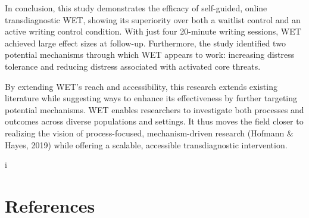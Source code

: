 \documentclass[
  man,floatsintext]{apa7}
\begin{document}
In conclusion, this study demonstrates the efficacy of self-guided, online transdiagnostic WET, showing its superiority over both a waitlist control and an active writing control condition.
With just four 20-minute writing sessions, WET achieved large effect sizes at follow-up.
Furthermore, the study identified two potential mechanisms through which WET appears to work: increasing distress tolerance and reducing distress associated with activated core threats.

By extending WET's reach and accessibility, this research extends existing literature while suggesting ways to enhance its effectiveness by further targeting potential mechanisms.
WET enables researchers to investigate both processes and outcomes across diverse populations and settings.
It thus moves the field closer to realizing the vision of process-focused, mechanism-driven research (Hofmann \& Hayes, 2019) while offering a scalable, accessible transdiagnostic intervention.

\newpage

i

\newpage

\section{References}\label{references}
\end{document}
